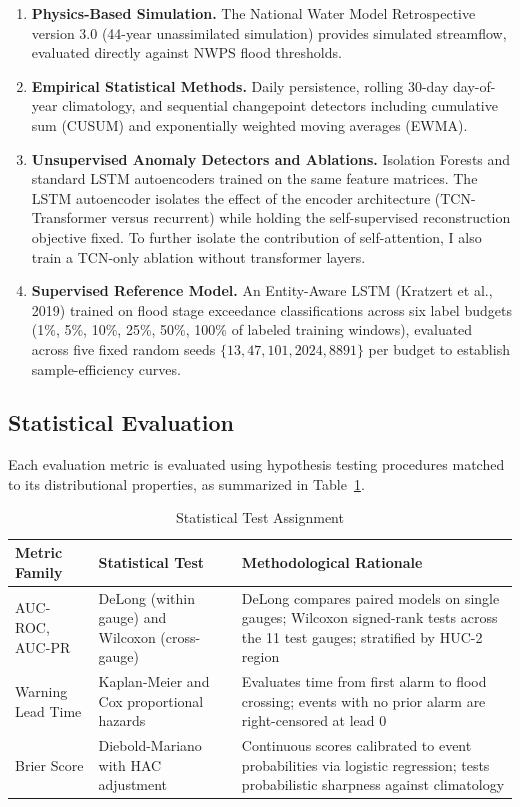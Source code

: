 \documentclass[12pt]{report}
\begin{document}
\begin{enumerate}
  \item \textbf{Physics-Based Simulation.} The National Water Model Retrospective version 3.0 (44-year unassimilated simulation) provides simulated streamflow, evaluated directly against NWPS flood thresholds.
  \item \textbf{Empirical Statistical Methods.} Daily persistence, rolling 30-day day-of-year climatology, and sequential changepoint detectors including cumulative sum (CUSUM) and exponentially weighted moving averages (EWMA).
  \item \textbf{Unsupervised Anomaly Detectors and Ablations.} Isolation Forests and standard LSTM autoencoders trained on the same feature matrices. The LSTM autoencoder isolates the effect of the encoder architecture (TCN-Transformer versus recurrent) while holding the self-supervised reconstruction objective fixed. To further isolate the contribution of self-attention, I also train a TCN-only ablation without transformer layers.
  \item \textbf{Supervised Reference Model.} An Entity-Aware LSTM (Kratzert et al., 2019) trained on flood stage exceedance classifications across six label budgets (1\%, 5\%, 10\%, 25\%, 50\%, 100\% of labeled training windows), evaluated across five fixed random seeds $\{13, 47, 101, 2024, 8891\}$ per budget to establish sample-efficiency curves.
\end{enumerate}

\subsection{Statistical Evaluation}

Each evaluation metric is evaluated using hypothesis testing procedures matched to its distributional properties, as summarized in Table~\ref{tab:stats}.

\begin{table}[h]
  \caption{Statistical Test Assignment}
  \label{tab:stats}
  \centering
  \begin{tabular}{|p{3.0cm}|p{4.2cm}|p{4.8cm}|}
    \hline
    \textbf{Metric Family} & \textbf{Statistical Test} & \textbf{Methodological Rationale} \\
    \hline
    AUC-ROC, AUC-PR & DeLong (within gauge) and Wilcoxon (cross-gauge) & DeLong compares paired models on single gauges; Wilcoxon signed-rank tests across the 11 test gauges; stratified by HUC-2 region \\
    \hline
    Warning Lead Time & Kaplan-Meier and Cox proportional hazards & Evaluates time from first alarm to flood crossing; events with no prior alarm are right-censored at lead 0 \\
    \hline
    Brier Score & Diebold-Mariano with HAC adjustment & Continuous scores calibrated to event probabilities via logistic regression; tests probabilistic sharpness against climatology \\
    \hline
  \end{tabular}
\end{table}
\end{document}
